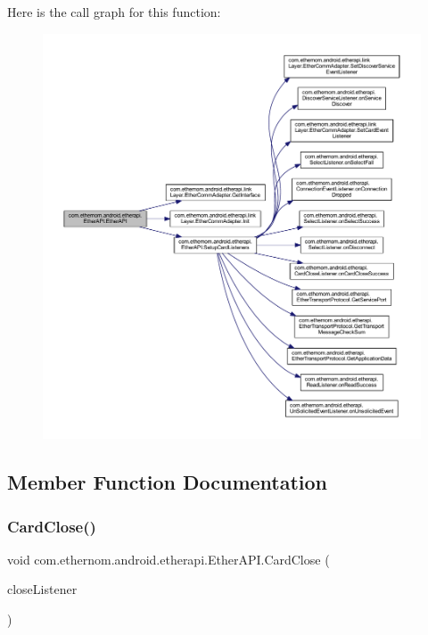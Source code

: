 Here is the call graph for this function\+:\nopagebreak
\begin{figure}[H]
\begin{center}
\leavevmode
\includegraphics[width=350pt]{classcom_1_1ethernom_1_1android_1_1etherapi_1_1_ether_a_p_i_a728fd002f0533c356fe852b83500b419_cgraph}
\end{center}
\end{figure}


\subsection{Member Function Documentation}
\mbox{\label{classcom_1_1ethernom_1_1android_1_1etherapi_1_1_ether_a_p_i_a75a0f23761ba90a058d2df1151e06d2b}} 
\subsubsection{\texorpdfstring{Card\+Close()}{CardClose()}}
{\footnotesize\ttfamily void com.\+ethernom.\+android.\+etherapi.\+Ether\+A\+P\+I.\+Card\+Close (\begin{DoxyParamCaption}\item[{final \mbox{\hyperlink{interfacecom_1_1ethernom_1_1android_1_1etherapi_1_1_card_close_listener}{Card\+Close\+Listener}}}]{close\+Listener }\end{DoxyParamCaption})}



